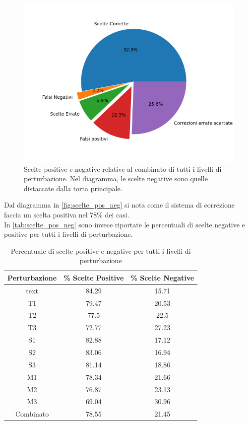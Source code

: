 \documentclass[12pt]{article}
\begin{document}
\begin{figure}[H]
\centering
\includegraphics[width=\textwidth,trim={0 1.5cm 0 1cm},clip]{distributions/overview_scelte_combinato}
\caption{Scelte positive e negative relative al combinato di tutti i livelli di perturbazione. Nel diagramma, le scelte negative sono quelle distaccate dalla torta principale.}
\label{fig:scelte_pos_neg}
\end{figure}

Dal diagramma in \autoref{fig:scelte_pos_neg} si nota come il sistema di correzione faccia un scelta positiva nel 78\% dei casi.\\
In \autoref{tab:scelte_pos_neg} sono invece riportate le percentuali di scelte negative e positive per tutti i livelli di perturbazione.


\begin{table}[H]
\centering
\begin{tabular}{ccc}
\textbf{Perturbazione} & \textbf{\% Scelte Positive} & \textbf{\% Scelte Negative} \\ \hline
text& 84.29& 15.71\\
T1& 79.47& 20.53\\
T2& 77.5& 22.5\\
T3& 72.77& 27.23\\
S1& 82.88& 17.12\\
S2& 83.06& 16.94\\
S3& 81.14& 18.86\\
M1& 78.34& 21.66\\
M2& 76.87& 23.13\\
M3& 69.04& 30.96\\
Combinato& 78.55& 21.45\\
\end{tabular}
\caption{Percentuale di scelte positive e negative per tutti i livelli di perturbazione}
\label{tab:scelte_pos_neg}
\end{table}
\end{document}
